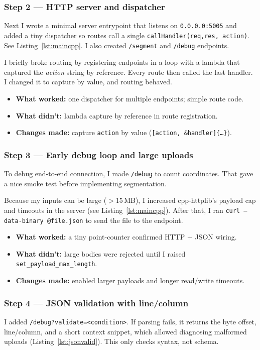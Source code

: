\documentclass[11pt,twoside]{report}
\begin{document}
\subsubsection*{Step 2 — HTTP server and dispatcher}
Next I wrote a minimal server entrypoint that listens on \texttt{0.0.0.0:5005} and added a tiny dispatcher so routes call a single \texttt{callHandler(req,res, action)}. See Listing~\ref{lst:maincpp}. I also created \texttt{/segment} and \texttt{/debug} endpoints.

I briefly broke routing by registering endpoints in a loop with a lambda that captured the \emph{action} string by reference. Every route then called the last handler. I changed it to capture by value, and routing behaved.

\begin{itemize}
	\item \textbf{What worked:} one dispatcher for multiple endpoints; simple route code.
	\item \textbf{What didn’t:} lambda capture by reference in route registration.
	\item \textbf{Changes made:} capture \texttt{action} by value (\texttt{[action, \&handler]\{\ldots\}}).
\end{itemize}

\subsubsection*{Step 3 — Early debug loop and large uploads}
To debug end-to-end connection, I made \texttt{/debug} to count coordinates. That gave a nice smoke test before implementing segmentation.

Because my inputs can be large (\(>\)15\,MB), I increased cpp-httplib’s payload cap and timeouts in the server (see Listing~\ref{lst:maincpp}). After that, I ran \texttt{curl --data-binary @file.json} to send the file to the endpoint.

\begin{itemize}
	\item \textbf{What worked:} a tiny point-counter confirmed HTTP + JSON wiring.
	\item \textbf{What didn’t:} large bodies were rejected until I raised \texttt{set\_payload\_max\_length}.
	\item \textbf{Changes made:} enabled larger payloads and longer read/write timeouts.
\end{itemize}

\subsubsection*{Step 4 — JSON validation with line/column}
I added \texttt{/debug?validate=<condition>}. If parsing fails, it returns the byte offset, line/column, and a short context snippet, which allowed diagnosing malformed uploads (Listing~\ref{lst:jsonvalid}). This only checks syntax, not schema.
\end{document}
